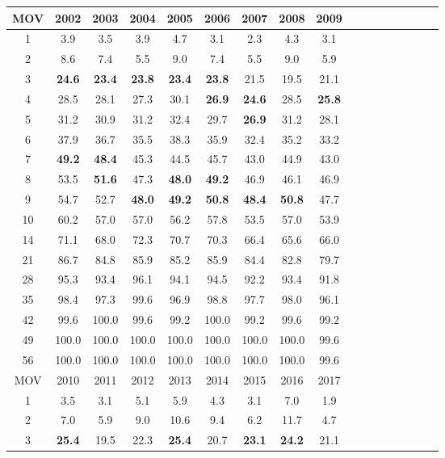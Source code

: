 \documentclass[11pt]{article}
\begin{document}
\begin{table}[!htb]
\begin{center}
\scriptsize
\begin{tabular}{|c|c|c|c|c|c|c|c|c|c|c|c|c|c|c|c|c|}
\hline
MOV & 2002 & 2003 & 2004 & 2005 & 2006 & 2007 & 2008 & 2009 \\
\hline
1 & 3.9 & 3.5 & 3.9 & 4.7 & 3.1 & 2.3 & 4.3 & 3.1\\
2 & 8.6 & 7.4 & 5.5 & 9.0 & 7.4 & 5.5 & 9.0 & 5.9\\
3 & \textbf{24.6} & \textbf{23.4} & \textbf{23.8} & \textbf{23.4} & \textbf{23.8} & 21.5 & 19.5 & 21.1\\
4 & 28.5 & 28.1 & 27.3 & 30.1 & \textbf{26.9} & \textbf{24.6} & 28.5 & \textbf{25.8}\\
5 & 31.2 & 30.9 & 31.2 & 32.4 & 29.7 & \textbf{26.9} & 31.2 & 28.1\\
6 & 37.9 & 36.7 & 35.5 & 38.3 & 35.9 & 32.4 & 35.2 & 33.2\\
7 & \textbf{49.2} & \textbf{48.4} & 45.3 & 44.5 & 45.7 & 43.0 & 44.9 & 43.0\\
8 & 53.5 & \textbf{51.6} & 47.3 & \textbf{48.0} & \textbf{49.2} & 46.9 & 46.1 & 46.9\\
9 & 54.7 & 52.7 & \textbf{48.0} & \textbf{49.2} & \textbf{50.8} & \textbf{48.4} & \textbf{50.8} & 47.7\\
10 & 60.2 & 57.0 & 57.0 & 56.2 & 57.8 & 53.5 & 57.0 & 53.9\\
14 & 71.1 & 68.0 & 72.3 & 70.7 & 70.3 & 66.4 & 65.6 & 66.0\\
21 & 86.7 & 84.8 & 85.9 & 85.2 & 85.9 & 84.4 & 82.8 & 79.7\\
28 & 95.3 & 93.4 & 96.1 & 94.1 & 94.5 & 92.2 & 93.4 & 91.8\\
35 & 98.4 & 97.3 & 99.6 & 96.9 & 98.8 & 97.7 & 98.0 & 96.1\\
42 & 99.6 & 100.0 & 99.6 & 99.2 & 100.0 & 99.2 & 99.6 & 99.2\\
49 & 100.0 & 100.0 & 100.0 & 100.0 & 100.0 & 100.0 & 100.0 & 99.6\\
56 & 100.0 & 100.0 & 100.0 & 100.0 & 100.0 & 100.0 & 100.0 & 99.6\\
\hline
\hline
MOV & 2010 & 2011 & 2012 & 2013 & 2014 & 2015 & 2016 & 2017 \\
\hline
1 & 3.5 & 3.1 & 5.1 & 5.9 & 4.3 & 3.1 & 7.0 & 1.9\\
2 & 7.0 & 5.9 & 9.0 & 10.6 & 9.4 & 6.2 & 11.7 & 4.7\\
3 & \textbf{25.4} & 19.5 & 22.3 & \textbf{25.4} & 20.7 & \textbf{23.1} & \textbf{24.2} & 21.1\\

\end{tabular}
\end{center}
\end{table}
\end{document}
